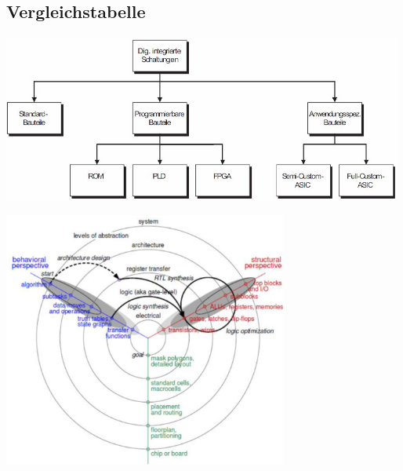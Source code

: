 %
%

%
%

\subsection{Vergleichstabelle}
\begin{minipage}{0.41\textwidth}
\includegraphics[width=0.99\textwidth]{images/devicecomparetables}
\end{minipage}
\hfill
\begin{minipage}{0.58\textwidth}
\includegraphics[width=0.7\textwidth]{images/abstraktion.png}
\end{minipage}

